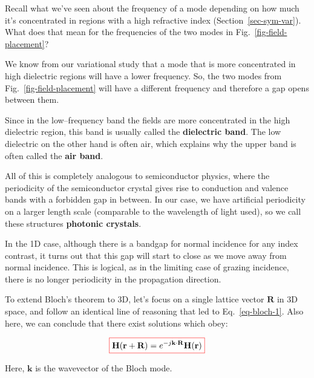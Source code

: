 \begin{cue}
Recall what we've seen about the frequency of a mode depending on how much it's concentrated in regions with a high refractive index (Section~\ref{sec-sym-var}). What does that mean for the frequencies of the two modes in Fig.~\ref{fig-field-placement}?
\end{cue}

We know from our variational study that a mode that is more concentrated in high dielectric regions will have a lower frequency. So, the two modes from Fig.~\ref{fig-field-placement} will have a different frequency and therefore a gap opens between them.

Since in the low--frequency band the fields are more concentrated in the high dielectric region, this band is usually called the \textbf{dielectric band}.  The low dielectric on the other hand is often air, which explains why the upper band is often called the \textbf{air band}.

All of this is completely analogous to semiconductor physics, where the periodicity of the semiconductor crystal gives rise to conduction and valence bands with a forbidden gap in between. In our case, we have artificial periodicity on a larger length scale (comparable to the wavelength of light used), so we call these structures \textbf{photonic crystals}.

In the 1D case, although there is a bandgap for normal incidence for any index contrast, it turns out that this gap will start to close as we move away from normal incidence. This is logical, as in the limiting case of grazing incidence, there is no longer periodicity in the propagation direction.

\pagebreak


To extend Bloch's theorem to 3D, let's focus on a single lattice vector ${\mathbf R}$ in 3D space, and follow an identical line of reasoning that led to Eq.~\ref{eq-bloch-1}. Also here, we can conclude that there exist solutions which obey:

\begin{equation}
\fbox{$\displaystyle
{\mathbf H} ({\mathbf r}+ {\mathbf R}) = e^{-j {\mathbf k} \cdot {\mathbf R}} {\mathbf H} ({\mathbf r})
$}
\end{equation} 

Here, ${\mathbf k}$ is the wavevector of the Bloch mode. \noindent{}

